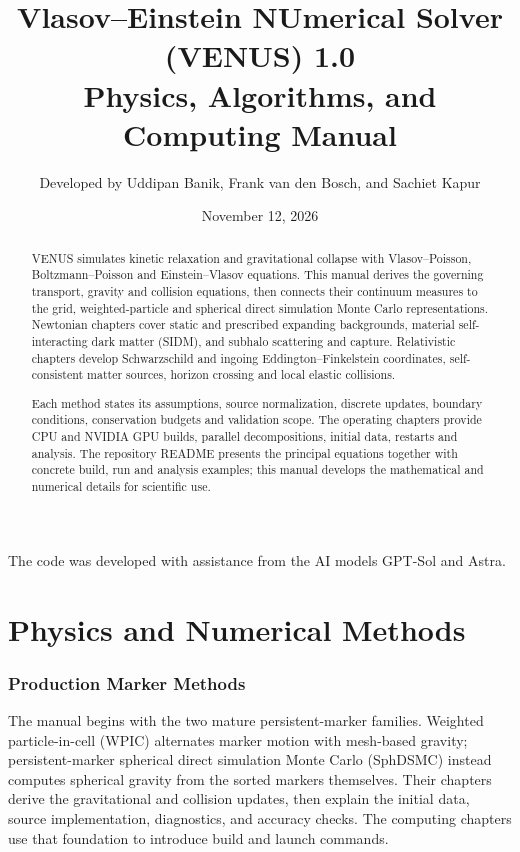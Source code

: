 \documentclass[11pt]{article}
\title{Vlasov--Einstein NUmerical Solver (VENUS) 1.0\\
\large Physics, Algorithms, and Computing Manual}
\author{Developed by Uddipan Banik, Frank van den Bosch, and Sachiet Kapur}
\date{November 12, 2026}
\begin{document}
\maketitle

\begin{center}\small
The code was developed with assistance from the AI models GPT-Sol and Astra.
\end{center}

\begin{abstract}
VENUS simulates kinetic relaxation and gravitational collapse with
Vlasov--Poisson, Boltzmann--Poisson and Einstein--Vlasov equations. This
manual derives the governing transport, gravity and collision equations,
then connects their continuum measures to the grid, weighted-particle and
spherical direct simulation Monte Carlo representations. Newtonian chapters
cover static and prescribed expanding backgrounds, material self-interacting
dark matter (SIDM), and subhalo scattering and capture. Relativistic chapters
develop Schwarzschild and ingoing Eddington--Finkelstein coordinates,
self-consistent matter sources, horizon crossing and local elastic collisions.

Each method states its assumptions, source normalization, discrete updates,
boundary conditions, conservation budgets and validation scope. The operating
chapters provide CPU and NVIDIA GPU builds, parallel decompositions, initial
data, restarts and analysis. The repository README presents the principal
equations together with concrete build, run and analysis examples; this
manual develops the mathematical and numerical details for scientific use.
\end{abstract}

\tableofcontents



\part{Physics and Numerical Methods}

\section{Production Marker Methods}

The manual begins with the two mature persistent-marker families.  Weighted
particle-in-cell (WPIC) alternates marker motion with mesh-based gravity;
persistent-marker spherical direct simulation Monte Carlo (SphDSMC) instead
computes spherical gravity from the sorted markers themselves.  Their chapters derive the gravitational and collision updates, then explain
the initial data, source implementation, diagnostics, and accuracy checks.
The computing chapters use that foundation to introduce build and launch
commands.
\end{document}
